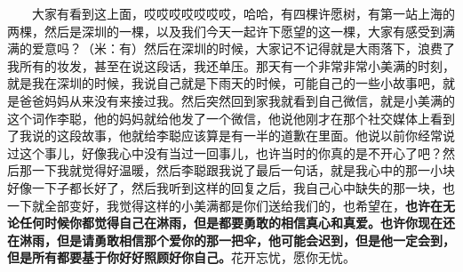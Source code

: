 \documentclass[]{ctexbook}
\begin{document}
  大家有看到这上面，哎哎哎哎哎哎哎，哈哈，有四棵许愿树，有第一站上海的两棵，然后是深圳的一棵，以及我们今天一起许下愿望的这一棵，大家有感受到满满的爱意吗？（米：有）然后在深圳的时候，大家记不记得就是大雨落下，浪费了我所有的妆发，甚至在说这段话，我还单压。那天有一个非常非常小美满的时刻，就是我在深圳的时候，我说自己就是下雨天的时候，可能自己的一些小故事吧，就是爸爸妈妈从来没有来接过我。然后突然回到家我就看到自己微信，就是小美满的这个词作李聪，他的妈妈就给他发了一个微信，他说他刚才在那个社交媒体上看到了我说的这段故事，他就给李聪应该算是有一半的道歉在里面。他说以前你经常说过这个事儿，好像我心中没有当过一回事儿，也许当时的你真的是不开心了吧？然后那一下我就觉得好温暖，然后李聪跟我说了最后一句话，就是我心中的那一小块好像一下子都长好了，然后我听到这样的回复之后，我自己心中缺失的那一块，也一下就全部变好，我觉得这样的小美满都是你们送给我们的，也希望在，\textbf{也许在无论任何时候你都觉得自己在淋雨，但是都要勇敢的相信真心和真爱。也许你现在还在淋雨，但是请勇敢相信那个爱你的那一把伞，他可能会迟到，但是他一定会到，但是所有都要基于你好好照顾好你自己。}花开忘忧，愿你无忧。
\end{document}
